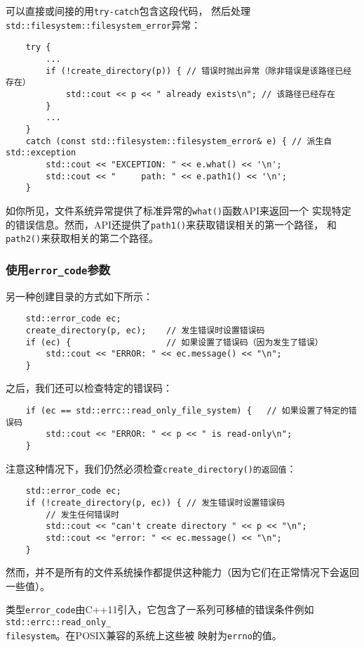 可以直接或间接的用\texttt{try-catch}包含这段代码，
然后处理\texttt{std::filesystem::filesystem\_error}异常：
\begin{lstlisting}
    try {
        ...
        if (!create_directory(p)) { // 错误时抛出异常（除非错误是该路径已经存在）
            std::cout << p << " already exists\n"; // 该路径已经存在
        }
        ...
    }
    catch (const std::filesystem::filesystem_error& e) { // 派生自std::exception
        std::cout << "EXCEPTION: " << e.what() << '\n';
        std::cout << "     path: " << e.path1() << '\n';
    }
\end{lstlisting}
如你所见，文件系统异常提供了标准异常的\texttt{what()}函数API来返回一个
实现特定的错误信息。然而，API还提供了\texttt{path1()}来获取错误相关的第一个路径，
和\texttt{path2()}来获取相关的第二个路径。

\subsubsection{使用\texttt{error\_code}参数}\label{ch20.2.6.2}
另一种创建目录的方式如下所示：
\begin{lstlisting}
    std::error_code ec;
    create_directory(p, ec);    // 发生错误时设置错误码
    if (ec) {                   // 如果设置了错误码（因为发生了错误）
        std::cout << "ERROR: " << ec.message() << "\n";
    }
\end{lstlisting}
之后，我们还可以检查特定的错误码：
\begin{lstlisting}
    if (ec == std::errc::read_only_file_system) {   // 如果设置了特定的错误码
        std::cout << "ERROR: " << p << " is read-only\n";
    }
\end{lstlisting}
注意这种情况下，我们仍然必须检查\texttt{create\_directory()的返回值}：
\begin{lstlisting}
    std::error_code ec;
    if (!create_directory(p, ec)) { // 发生错误时设置错误码
        // 发生任何错误时
        std::cout << "can't create directory " << p << "\n";
        std::cout << "error: " << ec.message() << "\n";
    }
\end{lstlisting}
然而，并不是所有的文件系统操作都提供这种能力（因为它们在正常情况下会返回一些值）。

类型\texttt{error\_code}由C++11引入，它包含了一系列可移植的错误条件例如
\texttt{std::errc::read\_only\_\\
filesystem}。在POSIX兼容的系统上这些被
映射为\texttt{errno}的值。

